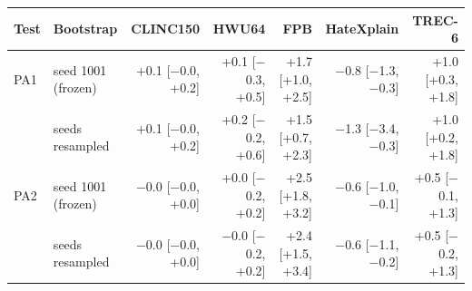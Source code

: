 \begin{tabular}{llrrrrr}
\toprule
Test & Bootstrap & CLINC150 & HWU64 & FPB & HateXplain & TREC-6 \\
\midrule
PA1 & seed 1001 (frozen) & +0.1 [$-$0.0, +0.2] & +0.1 [$-$0.3, +0.5] & +1.7 [+1.0, +2.5] & $-$0.8 [$-$1.3, $-$0.3] & +1.0 [+0.3, +1.8] \\
 & seeds resampled & +0.1 [$-$0.0, +0.2] & +0.2 [$-$0.2, +0.6] & +1.5 [+0.7, +2.3] & $-$1.3 [$-$3.4, $-$0.3] & +1.0 [+0.2, +1.8] \\
\midrule
PA2 & seed 1001 (frozen) & $-$0.0 [$-$0.0, +0.0] & +0.0 [$-$0.2, +0.2] & +2.5 [+1.8, +3.2] & $-$0.6 [$-$1.0, $-$0.1] & +0.5 [$-$0.1, +1.3] \\
 & seeds resampled & $-$0.0 [$-$0.0, +0.0] & $-$0.0 [$-$0.2, +0.2] & +2.4 [+1.5, +3.4] & $-$0.6 [$-$1.1, $-$0.2] & +0.5 [$-$0.2, +1.3] \\
\bottomrule
\end{tabular}
